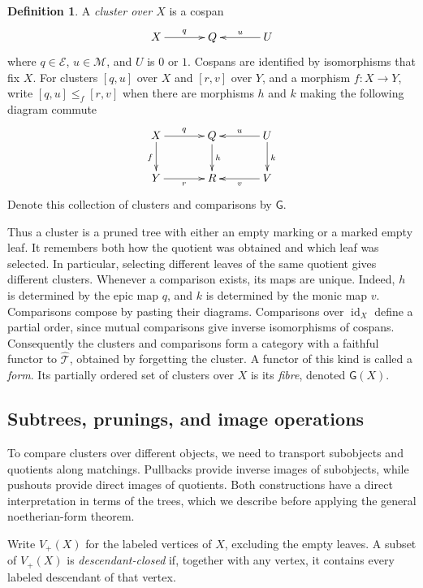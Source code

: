 \documentclass[11pt,a4paper]{article}
\theoremstyle{plain}
\theoremstyle{definition}
\newtheorem{definition}[theorem]{Definition}
\theoremstyle{remark}
\newcommand{\id}{\operatorname{id}}
\begin{document}
\begin{definition}\label{def:tree-clusters}
A \emph{cluster over $X$} is a cospan
\[
 \xymatrix@C=3.5em{
 X\ar[r]^q&Q&U\ar[l]_u
 }
\]
where $q\in\mathcal E$, $u\in\mathcal M$, and $U$ is $0$ or
$1$. Cospans are identified by isomorphisms that fix $X$.
For clusters $[q,u]$ over $X$ and $[r,v]$ over $Y$, and a
morphism $f:X\to Y$, write $[q,u]\le_f[r,v]$ when there are
morphisms $h$ and $k$ making the following diagram commute
\[
 \xymatrix@C=3.5em@R=2.4em{
 X\ar[r]^q\ar[d]_f&Q\ar[d]^h&U\ar[l]_u\ar[d]^k\\
 Y\ar[r]_r&R&V\ar[l]^v
 }
\]
Denote this collection of clusters and comparisons by $\mathsf G$.
\end{definition}

Thus a cluster is a pruned tree with either an empty marking or
a marked empty leaf. It remembers both how the quotient was
obtained and which leaf was selected. In particular, selecting
different leaves of the same quotient gives different clusters.
Whenever a comparison exists, its maps are unique. Indeed, $h$
is determined by the epic map $q$, and $k$ is determined by
the monic map $v$. Comparisons compose by pasting their diagrams.
Comparisons over $\id_X$ define a partial order,
since mutual comparisons give inverse isomorphisms of cospans.
Consequently the clusters and comparisons form a category with
a faithful functor to $\widehat{\mathcal T}$, obtained by
forgetting the cluster. A functor of this kind is called a
\emph{form}. Its partially ordered set of clusters over $X$
is its \emph{fibre}, denoted $\mathsf G(X)$.

\subsection{Subtrees, prunings, and image operations}\label{sec:tree-form-images}
To compare clusters over different objects, we need to transport
subobjects and quotients along matchings. Pullbacks provide inverse
images of subobjects, while pushouts provide direct images of
quotients. Both constructions have a direct interpretation in
terms of the trees, which we describe before applying the general
noetherian-form theorem.

\label{not:labeled-vertices}
Write $V_+(X)$ for the labeled vertices of $X$, excluding the
empty leaves. A subset of $V_+(X)$ is \emph{descendant-closed}
if, together with any vertex, it contains every labeled descendant
of that vertex.
\end{document}
